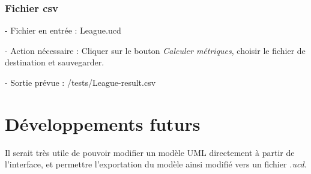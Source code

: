 \documentclass[letter,french]{report}
\begin{document}
  \subsubsection{Fichier csv}
  - Fichier en entrée : League.ucd

  - Action nécessaire : Cliquer sur le bouton \emph{Calculer métriques},
  choisir le fichier de destination et sauvegarder.

  - Sortie prévue : /tests/League-result.csv
  

	\section*{Développements futurs}
	Il serait très utile de pouvoir modifier un modèle UML directement à partir de l'interface,
	et permettre l'exportation du modèle ainsi modifié vers un fichier \emph{.ucd}.
	
	
\end{document}
